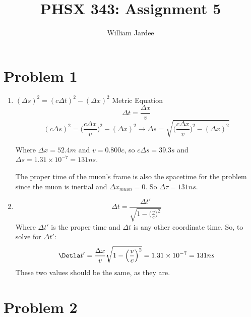 \documentclass[11pt]{article}
\begin{document}
\date{}

\title{PHSX 343: Assignment 5}

\author{William Jardee}

\maketitle


\section*{Problem 1}

\begin{enumerate}[label=\alph*)]
    \item 
        $(\Delta s)^2 = (c\Delta t)^2 -(\Delta x)^2$ Metric Equation
    \[\Delta t = \frac{\Delta x}{v}\]
    \[(c\Delta s)^2 = \Big(\frac{c\Delta x}{v}\Big)^2 - (\Delta x)^2 \rightarrow \Delta s = \sqrt{\Big(\frac{c \Delta x}{v}\Big)^2 - (\Delta x)^2}\]
    \begin{center}
        Where $\Delta x = 52.4 m$ and $v = 0.800c$, so $c\Delta s = 39.3s$ and $\Delta s = 1.31\times 10^{-7}= 131ns$.
    \end{center}
    The proper time of the muon's frame is also the spacetime for the problem since the muon is inertial and $\Delta x_{muon} = 0$. So $\Delta \tau = 131 ns$.
    
    \item
    \[\Delta t = \frac{\Delta t'}{\sqrt{1-\Big(\frac{v}{c}\Big)^2}}\]
    Where $\Delta t'$ is the proper time and $\Delta t$ is any other coordinate time. So, to solve for $\Delta t'$:
    \[\Detla t' = \frac{\Delta x}{v} \sqrt{1-\Big(\frac{v}{c}\Big)^2} = 1.31\times10^{-7} = 131ns\]
    \newline
    These two values should be the same, as they are. 
    
\end{enumerate}

\section*{Problem 2}
\end{document}
